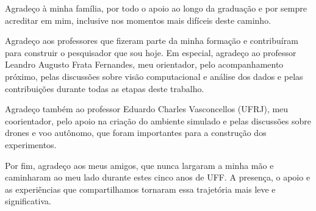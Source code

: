 \begin{agradecimentos}
Agradeço à minha família, por todo o apoio ao longo da graduação e por sempre acreditar em mim, inclusive nos momentos mais difíceis deste caminho.

Agradeço aos professores que fizeram parte da minha formação e contribuíram para construir o pesquisador que sou hoje. Em especial, agradeço ao professor Leandro Augusto Frata Fernandes, meu orientador, pelo acompanhamento próximo, pelas discussões sobre visão computacional e análise dos dados e pelas contribuições durante todas as etapas deste trabalho.

Agradeço também ao professor Eduardo Charles Vasconcellos (UFRJ), meu coorientador, pelo apoio na criação do ambiente simulado e pelas discussões sobre drones e voo autônomo, que foram importantes para a construção dos experimentos.

Por fim, agradeço aos meus amigos, que nunca largaram a minha mão e caminharam ao meu lado durante estes cinco anos de UFF. A presença, o apoio e as experiências que compartilhamos tornaram essa trajetória mais leve e significativa.
\end{agradecimentos}
